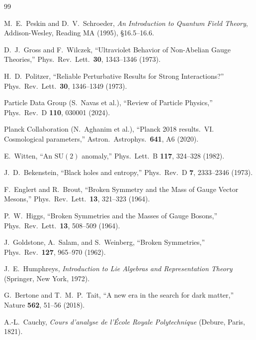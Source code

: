 \documentclass[11pt]{article}
\begin{document}
\begin{thebibliography}{99}

 M.~E.~Peskin and D.~V.~Schroeder, \emph{An Introduction to Quantum Field Theory}, Addison-Wesley, Reading MA (1995), \S16.5--16.6.

 D.~J.~Gross and F.~Wilczek, ``Ultraviolet Behavior of Non-Abelian Gauge Theories,'' Phys.\ Rev.\ Lett.\ \textbf{30}, 1343--1346 (1973).

 H.~D.~Politzer, ``Reliable Perturbative Results for Strong Interactions?'' Phys.\ Rev.\ Lett.\ \textbf{30}, 1346--1349 (1973).

 Particle Data Group (S.~Navas et al.), ``Review of Particle Physics,'' Phys.\ Rev.\ D \textbf{110}, 030001 (2024).

 Planck Collaboration (N.~Aghanim et al.), ``Planck 2018 results.\ VI\@. Cosmological parameters,'' Astron.\ Astrophys.\ \textbf{641}, A6 (2020).

 E.~Witten, ``An $\mathrm{SU}(2)$ anomaly,'' Phys.\ Lett.\ B \textbf{117}, 324--328 (1982).

 J.~D.~Bekenstein, ``Black holes and entropy,'' Phys.\ Rev.\ D \textbf{7}, 2333--2346 (1973).

 F.~Englert and R.~Brout, ``Broken Symmetry and the Mass of Gauge Vector Mesons,'' Phys.\ Rev.\ Lett.\ \textbf{13}, 321--323 (1964).

 P.~W.~Higgs, ``Broken Symmetries and the Masses of Gauge Bosons,'' Phys.\ Rev.\ Lett.\ \textbf{13}, 508--509 (1964).

 J.~Goldstone, A.~Salam, and S.~Weinberg, ``Broken Symmetries,'' Phys.\ Rev.\ \textbf{127}, 965--970 (1962).

 J.~E.~Humphreys, \emph{Introduction to Lie Algebras and Representation Theory} (Springer, New York, 1972).

 G.~Bertone and T.~M.~P.~Tait, ``A new era in the search for dark matter,'' Nature \textbf{562}, 51--56 (2018).

 A.-L.~Cauchy, \emph{Cours d'analyse de l'\'{E}cole Royale Polytechnique} (Debure, Paris, 1821).

\end{thebibliography}
\end{document}
